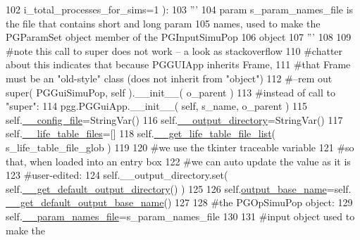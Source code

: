 \begin{DoxyCode}
102                             i\_total\_processes\_for\_sims=1 ):
103         \textcolor{stringliteral}{'''}
104 \textcolor{stringliteral}{        param s\_param\_names\_file is the file that contains short and long param}
105 \textcolor{stringliteral}{        names, used to make the PGParamSet object  member of the PGInputSimuPop }
106 \textcolor{stringliteral}{        object}
107 \textcolor{stringliteral}{        '''}
108 
109         \textcolor{comment}{#note this call to super does not work -- a look as stackoverflow}
110         \textcolor{comment}{#chatter about this indicates that because PGGUIApp inherits Frame,}
111         \textcolor{comment}{#that Frame must be an "old-style" class (does not inherit from "object")}
112         \textcolor{comment}{#--rem out super( PGGuiSimuPop, self ).\_\_init\_\_( o\_parent )}
113         \textcolor{comment}{#instead of call to "super":}
114         pgg.PGGuiApp.\_\_init\_\_( self, s\_name, o\_parent )
115         self.\hyperlink{classnegui_1_1pgguisimupop_1_1PGGuiSimuPop_accf4b1e619efda180dcd4795425f88c8}{\_\_config\_file}=StringVar()
116         self.\hyperlink{classnegui_1_1pgguisimupop_1_1PGGuiSimuPop_a8c3dba3a47984c6174e659458da1d4c6}{\_\_output\_directory}=StringVar()
117         self.\hyperlink{classnegui_1_1pgguisimupop_1_1PGGuiSimuPop_a1871547ce6fe9a86b10a30f3d7b41cdd}{\_\_life\_table\_files}=[]
118         self.\hyperlink{classnegui_1_1pgguisimupop_1_1PGGuiSimuPop_a12344f4fdce230b8fbb699dbd74c95a2}{\_\_get\_life\_table\_file\_list}( s\_life\_table\_file\_glob )
119 
120         \textcolor{comment}{#we use the tkinter traceable variable}
121         \textcolor{comment}{#so that, when loaded into an entry box}
122         \textcolor{comment}{#we can auto update the value as it is }
123         \textcolor{comment}{#user-edited:}
124         self.\_\_output\_directory.set( self.\hyperlink{classnegui_1_1pgguisimupop_1_1PGGuiSimuPop_abba3f28989d693eadf8d8dd181502d06}{\_\_get\_default\_output\_directory}() )
125 
126         self.\hyperlink{classnegui_1_1pgguisimupop_1_1PGGuiSimuPop_aa5f9f17f0527c20e5556b574a3f97300}{output\_base\_name}=self.
      \hyperlink{classnegui_1_1pgguisimupop_1_1PGGuiSimuPop_a55130312327d03aa8e37d827a46929db}{\_\_get\_default\_output\_base\_name}() 
127 
128         \textcolor{comment}{#the PGOpSimuPop object:}
129         self.\hyperlink{classnegui_1_1pgguisimupop_1_1PGGuiSimuPop_a53d091be0140a85e8c45a76c0b89c370}{\_\_param\_names\_file}=s\_param\_names\_file
130 
131         \textcolor{comment}{#input object used to make the}

\end{DoxyCode}
